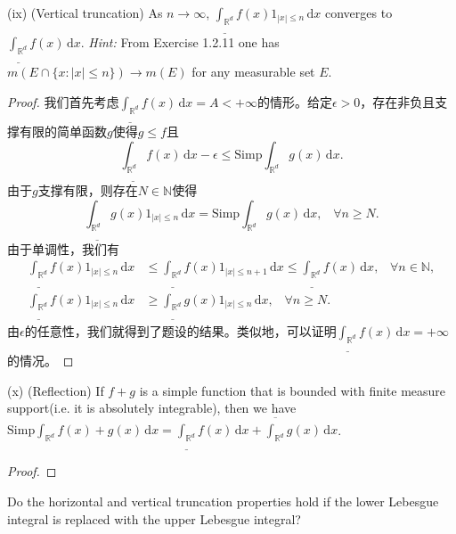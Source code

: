 \documentclass[reqno,a4paper,10pt]{amsart}
\newcommand\dif{\,\mathrm{d}}
\newcommand\Rnum{\mathbb{R}}
\newcommand{\abs}[1]{\left\vert#1\right\vert}
\begin{document}
(ix) (Vertical truncation) As $n\to \infty$, $\underline{\int_{\Rnum^d}}f(x)1_{\abs{x}\leq n}\dif x$ converges to $\underline{\int_{\Rnum^d}}f(x)\dif x$. \textit{Hint:} From Exercise 1.2.11 one has $m(E\cap\{x:\abs{x}\leq n\})\to m(E)$ for any measurable set $E$.
\begin{proof}
    我们首先考虑$\underline{\int_{\Rnum^d}}f(x)\dif x=A< +\infty$的情形。给定$\epsilon>0$，存在非负且支撑有限的简单函数$g$使得$g\leq f $且
    \begin{equation*}
        \underline{\int_{\Rnum^d}}f(x)\dif x-\epsilon\leq \mathrm{Simp}\int_{\Rnum^d}g(x)\dif x.
    \end{equation*}
    由于$g$支撑有限，则存在$N\in\mathbb{N}$使得
    \begin{equation*}
        \underline{\int_{\Rnum^d}}g(x)1_{\abs{x}\leq n}\dif x=\mathrm{Simp}\int_{\Rnum^d}g(x)\dif x,\;\;\;\forall n\geq N.
    \end{equation*}
    由于单调性，我们有
    \begin{equation*}
        \begin{split}
            \underline{\int_{\Rnum^d}}f(x)1_{\abs{x}\leq n}\dif x&\leq \underline{\int_{\Rnum^d}}f(x)1_{\abs{x}\leq n+1}\dif x\leq \underline{\int_{\Rnum^d}}f(x)\dif x,\;\;\;\forall n\in\mathbb{N},\\
            \underline{\int_{\Rnum^d}}f(x)1_{\abs{x}\leq n}\dif x&\geq \underline{\int_{\Rnum^d}}g(x)1_{\abs{x}\leq n}\dif x,\;\;\;\forall n\geq N.
        \end{split}
    \end{equation*}
    由$\epsilon$的任意性，我们就得到了题设的结果。类似地，可以证明$\underline{\int_{\Rnum^d}}f(x)\dif x=+\infty$的情况。
\end{proof}
(x) (Reflection) If $f+g$ is a simple function that is bounded with finite measure support(i.e. it is absolutely integrable), then we have $\mathrm{Simp}\int_{\Rnum^d} f(x)+g(x)\dif x=\underline{\int_{\Rnum^d}}f(x)\dif x+\overline{\int_{\Rnum^d}}g(x)\dif x$.
\begin{proof}
    
\end{proof}
Do the horizontal and vertical truncation properties hold if the lower Lebesgue integral is replaced with the upper Lebesgue integral?
\end{document}
